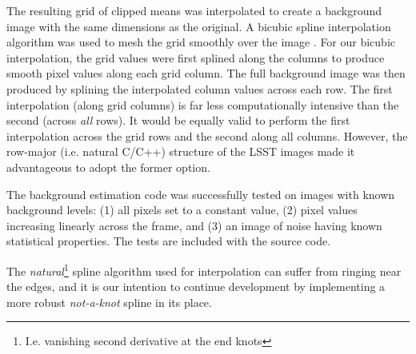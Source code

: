 The resulting grid of clipped means was interpolated to create a
background image with the same dimensions as the original.  A bicubic
spline interpolation algorithm was used to mesh the grid smoothly over
the image \citep{PressNR}.  For our bicubic interpolation, the
grid values were first splined along the columns to produce smooth
pixel values along each grid column.  The full background image was
then produced by splining the interpolated column values across each
row.  The first interpolation (along grid columns) is far less
computationally intensive than the second (across {\itshape all}
rows).  It would be equally valid to perform the first interpolation
across the grid rows and the second along all columns.  However, the
row-major (i.e. natural C/C++) structure of the LSST images made it advantageous to adopt
the former option.


The background estimation code was successfully tested on images with
known background levels: (1) all pixels set to a constant value, (2)
pixel values increasing linearly across the frame, and (3) an image of
noise having known statistical properties.  The tests are included
with the source code.


The {\itshape natural}\footnote{I.e. vanishing second derivative at the end knots}
spline algorithm used for interpolation can
suffer from ringing near the edges, and it is our intention to
continue development by implementing a more robust {\itshape
not-a-knot} spline in its place.
